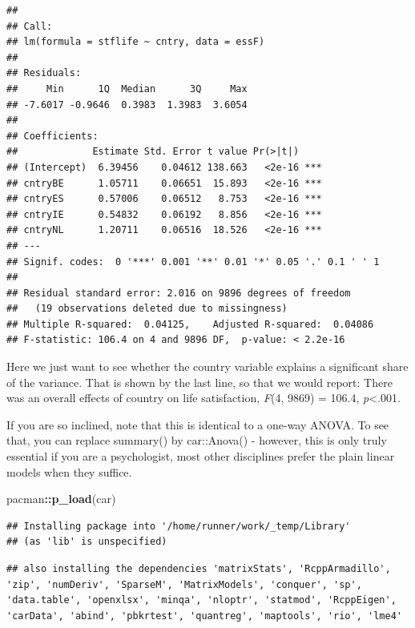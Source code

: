 \documentclass[
]{book}
\newenvironment{Shaded}{\begin{snugshade}}{\end{snugshade}}
\newcommand{\KeywordTok}[1]{\textcolor[rgb]{0.13,0.29,0.53}{\textbf{#1}}}
\newcommand{\NormalTok}[1]{#1}
\newcommand{\OperatorTok}[1]{\textcolor[rgb]{0.81,0.36,0.00}{\textbf{#1}}}
\begin{document}
\begin{verbatim}
## 
## Call:
## lm(formula = stflife ~ cntry, data = essF)
## 
## Residuals:
##     Min      1Q  Median      3Q     Max 
## -7.6017 -0.9646  0.3983  1.3983  3.6054 
## 
## Coefficients:
##             Estimate Std. Error t value Pr(>|t|)    
## (Intercept)  6.39456    0.04612 138.663   <2e-16 ***
## cntryBE      1.05711    0.06651  15.893   <2e-16 ***
## cntryES      0.57006    0.06512   8.753   <2e-16 ***
## cntryIE      0.54832    0.06192   8.856   <2e-16 ***
## cntryNL      1.20711    0.06516  18.526   <2e-16 ***
## ---
## Signif. codes:  0 '***' 0.001 '**' 0.01 '*' 0.05 '.' 0.1 ' ' 1
## 
## Residual standard error: 2.016 on 9896 degrees of freedom
##   (19 observations deleted due to missingness)
## Multiple R-squared:  0.04125,	Adjusted R-squared:  0.04086 
## F-statistic: 106.4 on 4 and 9896 DF,  p-value: < 2.2e-16
\end{verbatim}

Here we just want to see whether the country variable explains a significant share of the variance. That is shown by the last line, so that we would report: There was an overall effects of country on life satisfaction, \emph{F}(4, 9869) = 106.4, \emph{p}\textless.001.

If you are so inclined, note that this is identical to a one-way ANOVA. To see that, you can replace summary() by car::Anova() - however, this is only truly essential if you are a psychologist, most other disciplines prefer the plain linear models when they suffice.

\begin{Shaded}
\begin{Highlighting}[]
\NormalTok{pacman}\OperatorTok{::}\KeywordTok{p_load}\NormalTok{(car)}
\end{Highlighting}
\end{Shaded}

\begin{verbatim}
## Installing package into '/home/runner/work/_temp/Library'
## (as 'lib' is unspecified)
\end{verbatim}

\begin{verbatim}
## also installing the dependencies 'matrixStats', 'RcppArmadillo', 'zip', 'numDeriv', 'SparseM', 'MatrixModels', 'conquer', 'sp', 'data.table', 'openxlsx', 'minqa', 'nloptr', 'statmod', 'RcppEigen', 'carData', 'abind', 'pbkrtest', 'quantreg', 'maptools', 'rio', 'lme4'
\end{verbatim}
\end{document}
